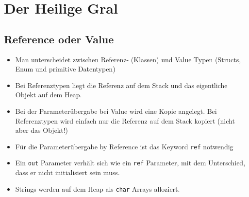 


\newcommand{\SUBJECT}{Zusammenfassung}
\newcommand{\TITLE}{Microsoft Technologien}




\lstset{style=visual-studio-style}

\section{Der Heilige Gral}
\subsection{Reference oder Value}
\begin{itemize}
	\item Man unterscheidet zwischen Referenz- (Klassen) und Value Typen (Structs, Enum und primitive Datentypen)
	\item Bei Referenztypen liegt die Referenz auf dem Stack und das eigentliche Objekt auf dem Heap.
	\item Bei der Parameterübergabe bei Value wird eine Kopie angelegt. Bei Referenztypen wird einfach nur die Referenz auf dem Stack kopiert (nicht aber das Objekt!)
	\item Für die Parameterübergabe by Reference ist das Keyword \lstinline|ref| notwendig
	\item Ein \lstinline|out| Parameter verhält sich wie ein \lstinline|ref| Parameter, mit dem Unterschied, dass er nicht initialisiert sein muss.
	\item Strings werden auf dem Heap als \lstinline|char| Arrays alloziert.
\end{itemize}

